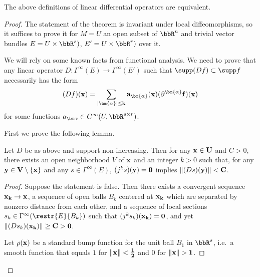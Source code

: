 \begin{thm}
    The above definitions of linear differential operators are equivalent.
\end{thm}
\begin{proof}
    The statement of the theorem is invariant under local diffeomorphisms, so it suffices to prove it for $M=U$ an open subset of $\bbR^n$ and trivial vector bundles $E=U\times\bbR^s)$, $E'=U\times\bbR^r)$ over it.

    We will rely on some known facts from functional analysis. We need to prove that any linear operator $D:\Gamma^\infty(E)\to \Gamma^\infty(E')$ such that $\supp (Df)\subset \supp f$ necessarily has the form 
    \[(Df)(\bf{x})=\sum_{|\bm{\alpha}|\leq k}a_{\bm{\alpha}}(\bf{x})(\partial^{\bm{\alpha}}f)(\bf{x})\]
    for some functions $a_{\bm\alpha}\in C^\infty(U,\bbR^{s\times r})$.

    First we prove the following lemma.
    \begin{lem}
        Let $D$ be as above and support non-increasing. Then for any $\bf{x}\in U$ and $C>0$, there exists an open neighborhood $V$ of $\bf{x}$ and an integer $k>0$ such that, for any $\bf{y}\in V\setminus\{\bf{x}\}$ and any $s\in\Gamma^\infty(E)$, $(j^ks)(\bf{y})=0$ implies $\lVert (Ds)(\bf{y})\rVert<C$.
    \end{lem}
    \begin{proof}
        Suppose the statement is false. Then there exists a convergent sequence $\bf{x}_k\to \bf{x}$, a sequence of open balls $B_k$ centered at $\bf{x}_k$ which are separated by nonzero distance from each other, and a sequence of local sections $s_k\in\Gamma^\infty(\restr{E}{B_k})$ such that $(j^ks_k)(\bf{x}_k)=0$, and yet $\lVert(Ds_k)(\bf{x}_k)\rVert\geq C>0$.

        Let $\rho(\bf{x})$ be a standard bump function for the unit ball $B_1$ in $\bbR^s$, i.e.\ a smooth function that equals $1$ for $\lVert\bf{x}\rVert<\frac12$ and $0$ for $\lVert\bf{x}\rVert>1$.


\end{proof}
\end{proof}

